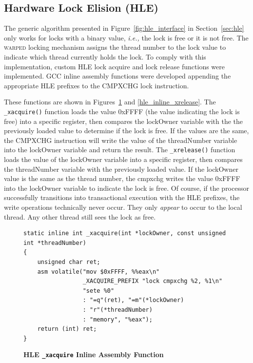 \documentclass[11pt]{book}
\begin{document}
\subsection{Hardware Lock Elision (HLE)}

The generic algorithm presented in Figure~\ref{fig:hle_interface} in
Section~\ref{sec:hle} only works for locks with a binary value, \emph{i.e.,} the
lock is free or it is not free.  The \textsc{warped} locking mechanism assigns
the thread number to the lock value to indicate which thread currently holds the
lock.  To comply with this implementation, custom HLE lock acquire and lock
release functions were implemented.  GCC inline assembly functions were
developed appending the appropriate HLE prefixes to the CMPXCHG lock
instruction.  

These functions are shown in Figures~\ref{hle_inline_xacquire} and
\ref{hle_inline_xrelease}.  The \texttt{\_xacquire()} function loads the value
0xFFFF (the value indicating the lock is free) into a specific register, then
compares the lockOwner variable with the the previously loaded value to
determine if the lock is free.  If the values are the same, the CMPXCHG
instruction will write the value of the threadNumber variable into the lockOwner
variable and return the result.  The \texttt{\_xrelease()} function loads the
value of the lockOwner variable into a specific register, then compares the
threadNumber variable with the previously loaded value.  If the lockOwner value
is the same as the thread number, the cmpxchg writes the value 0xFFFF into the
lockOwner variable to indicate the lock is free.  Of course, if the processor
successfully transitions into transactional execution with the HLE prefixes, the
write operations technically never occur.  They only \emph{appear} to occur to
the local thread. Any other thread still sees the lock as free.  

\begin{figure}
\begin{verbatim}
static inline int _xacquire(int *lockOwner, const unsigned int *threadNumber)
{
    unsigned char ret;
    asm volatile("mov $0xFFFF, %%eax\n"
                 _XACQUIRE_PREFIX "lock cmpxchg %2, %1\n" 
                 "sete %0"
                 : "=q"(ret), "=m"(*lockOwner)
                 : "r"(*threadNumber) 
                 : "memory", "%eax");
    return (int) ret;
}
\end{verbatim}
\caption{\textbf{HLE \texttt{\_xacquire} Inline Assembly Function}}\label{hle_inline_xacquire}
\end{figure}
\end{document}
